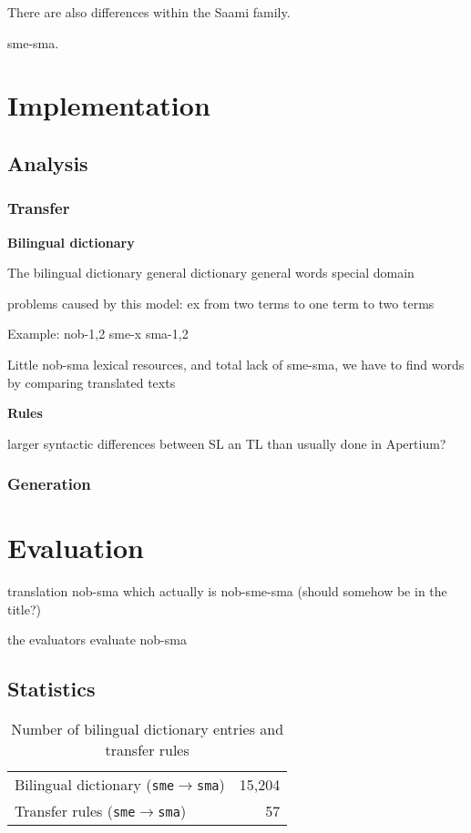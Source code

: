 \documentclass[a4paper,11pt,twocolumn]{article}
\begin{document}
There are also differences within the Saami family.

sme-sma.




\section{Implementation}

\subsection{Analysis}

\subsubsection{Transfer}


\textbf{Bilingual dictionary}


The bilingual dictionary
general dictionary
general words
special domain

\item problems caused by this model: ex from two terms to one term to two terms

Example: nob-1,2   sme-x   sma-1,2

Little nob-sma lexical resources, and total lack of sme-sma, we have to find words by comparing translated texts




\textbf{Rules}

\item larger syntactic differences between SL an TL than usually done in Apertium?

\subsubsection{Generation}

\section{Evaluation}
\item translation nob-sma which actually is nob-sme-sma (should somehow be in the title?) 
\item the evaluators evaluate nob-sma

\subsection{Statistics}
\begin{table}
  \begin{center}
    \begin{tabular}{|l|r|}
      \hline
      Bilingual dictionary ({\tt sme}$\rightarrow${\tt sma}) & 15,204 \\ %
      Transfer rules ({\tt sme}$\rightarrow${\tt sma}) & 57 \\
      \hline
    \end{tabular}
    \label{table:transfer}
    \caption{Number of bilingual dictionary entries and transfer rules}
  \end{center}
\end{table}
\end{document}
